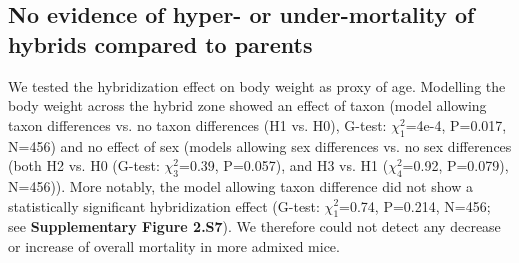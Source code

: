 \subsection{No evidence of hyper- or under-mortality of hybrids compared to parents}
We tested the hybridization effect on body weight as proxy of age. Modelling the body weight  across the hybrid zone showed an effect of taxon (model allowing taxon differences vs. no taxon differences (H1 vs. H0), G-test: $\chi_{1}^{2}$=4e-4, P=0.017, N=456) and no effect of sex (models allowing sex differences vs. no sex differences (both H2 vs. H0 (G-test: $\chi_{3}^{2}$=0.39, P=0.057), and H3 vs. H1 ($\chi_{4}^{2}$=0.92, P=0.079), N=456)). More notably, the model allowing taxon difference did not show a statistically significant hybridization effect (G-test: $\chi_{1}^{2}$=0.74, P=0.214, N=456; see \textbf{Supplementary Figure 2.S7}). We therefore could not detect any decrease or increase of overall mortality in more admixed mice.

